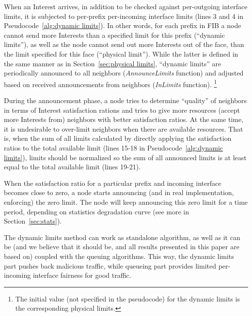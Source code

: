 When an Interest arrives, in addition to be checked against per-outgoing interface limits, it is subjected to per-prefix per-incoming interface limits (lines 3 and 4 in Pseudocode~\ref{alg:dynamic limits}).
In other words, for each prefix in FIB a node cannot send more Interests than a specified limit for this prefix (``dynamic limits''), as well as the node cannot send out more Interests out of the face, than the limit specified for this face (``physical limit'').
While the latter is defined in the same manner as in Section~\ref{sec:physical limits}, ``dynamic limits'' are periodically announced to all neighbors (\textit{AnnounceLimits} function) and adjusted based on received announcements from neighbors (\textit{InLimits} function).%
\footnote{The initial value (not specified in the pseudocode) for the dynamic limits is the corresponding physical limits.}

During the announcement phase, a node tries to determine ``quality'' of neighbors in terms of Interest satisfaction rations and tries to give more resources (accept more Interests from) neighbors with better satisfaction ratios.
At the same time, it is undesirable to over-limit neighbors when there are available resources.
That is, when the sum of all limits calculated by directly applying the satisfaction ratios to the total available limit (lines 15-18 in Pseudocode~\ref{alg:dynamic limits}), limits should be normalized so the sum of all announced limits is at least equal to the total available limit (lines 19-21).

When the satisfaction ratio for a particular prefix and incoming interface becomes close to zero, a node starts announcing (and in real implementation, enforcing) the zero limit.
The node will keep announcing this zero limit for a time period, depending on statistics degradation curve (see more in Section~\ref{sec:stats}).

The dynamic limits method can work as standalone algorithm, as well as it can be (and we believe that it should be, and all results presented in this paper are based on) coupled with the queuing algorithms.
This way, the dynamic limits part pushes back malicious traffic, while queueing part provides limited per-incoming interface fairness for good traffic.


